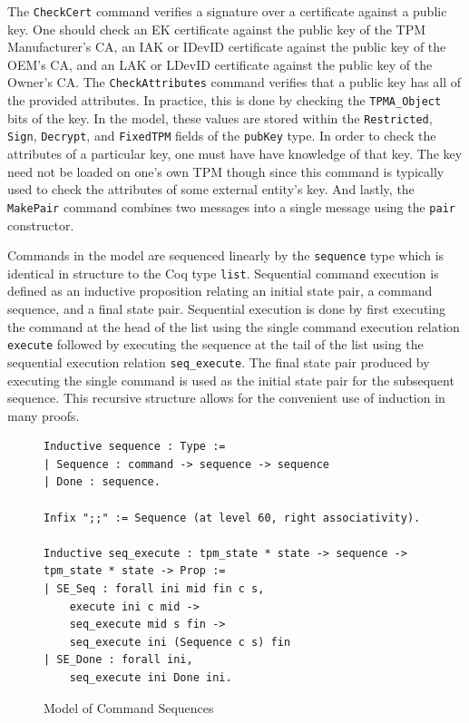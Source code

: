\documentclass[runningheads]{llncs}
\begin{document}
The \verb|CheckCert| command verifies a signature over a certificate against a public key. One should check an EK certificate against the public key of the TPM Manufacturer's CA, an IAK or IDevID certificate against the public key of the OEM's CA, and an LAK or LDevID certificate against the public key of the Owner's CA.
The \verb|CheckAttributes| command verifies that a public key has all of the provided attributes. In practice, this is done by checking the \verb|TPMA_Object|  bits of the key. In the model, these values are stored within the \verb|Restricted|, \verb|Sign|, \verb|Decrypt|, and \verb|FixedTPM| fields of the \verb|pubKey| type. In order to check the attributes of a particular key, one must have have knowledge of that key. The key need not be loaded on one's own TPM though since this command is typically used to check the attributes of some external entity's key. And lastly, the \verb|MakePair| command combines two messages into a single message using the \verb|pair| constructor.

Commands in the model are sequenced linearly by the \verb|sequence| type which is identical in structure to the Coq type \verb|list|. Sequential command execution is defined as an inductive proposition relating an initial state pair, a command sequence, and a final state pair. Sequential execution is done by first executing the command at the head of the list using the single command execution relation \verb|execute| followed by executing the sequence at the tail of the list using the sequential execution relation \verb|seq_execute|. The final state pair produced by executing the single command is used as the initial state pair for the subsequent sequence. This recursive structure allows for the convenient use of induction in many proofs.
\begin{figure}[h]
\begin{lstlisting}[language=Coq]
Inductive sequence : Type :=
| Sequence : command -> sequence -> sequence
| Done : sequence.

Infix ";;" := Sequence (at level 60, right associativity).

Inductive seq_execute : tpm_state * state -> sequence -> tpm_state * state -> Prop :=
| SE_Seq : forall ini mid fin c s,
    execute ini c mid ->
    seq_execute mid s fin ->
    seq_execute ini (Sequence c s) fin
| SE_Done : forall ini,
    seq_execute ini Done ini.
\end{lstlisting}
\caption{Model of Command Sequences}
\end{figure}
\end{document}
